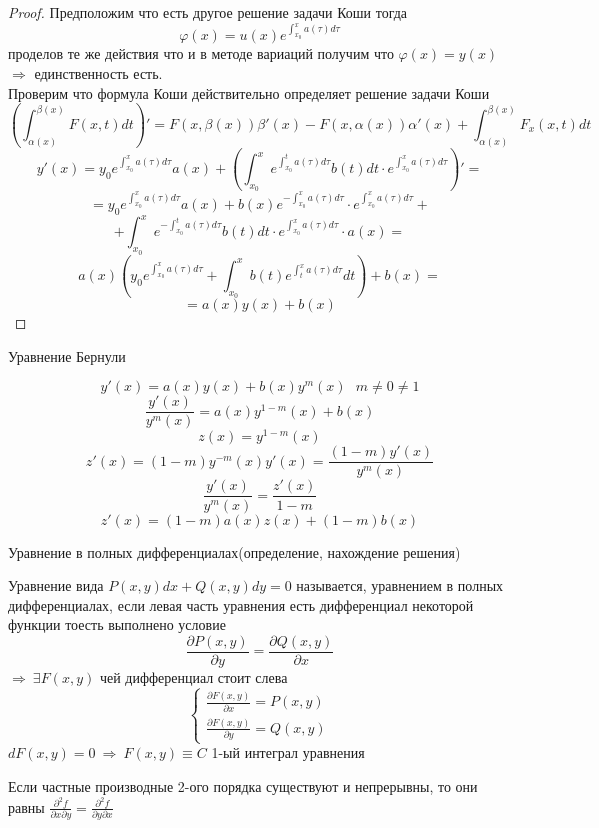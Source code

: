 \begin{proof}
  Предположим что есть другое решение задачи Коши тогда
  $$
  \varphi(x) = u(x) e^{\int_{x_0}^x a(\tau)d\tau}
  $$
  проделов те же действия что и в методе вариаций получим что
  $\varphi(x) = y(x)$ $\Rightarrow$ единственность есть. \\

  Проверим что формула Коши действительно определяет решение задачи Коши
  $$
  \left( \int_{\alpha(x)}^{\beta(x)} F(x, t) dt \right)' =
  F(x, \beta(x)) \beta'(x) - F(x, \alpha(x)) \alpha'(x) +
  \int_{\alpha(x)}^{\beta(x)} F_x(x, t)dt
  $$
  $$
  y'(x) = y_0 e^{\int_{x_0}^x a(\tau) d\tau} a(x) + \left( \int_{x_0}^x
  e^{\int_{x_0}^t a(\tau) d\tau} b(t)dt \cdot
  e^{\int_{x_0}^x a(\tau)d\tau} \right)' =
  $$
  $$
  = y_0 e^{\int_{x_0}^x a(\tau)d\tau} a(x) + b(x)
  e^{-\int_{x_0}^x a(\tau) d\tau} \cdot e^{\int_{x_0}^x a(\tau) d\tau} +
  $$
  $$
  + \int_{x_0}^x e^{-\int_{x_0}^t a(\tau) d\tau} b(t) dt \cdot
  e^{\int_{x_0}^x a(\tau) d\tau} \cdot a(x)=
  $$
  $$
  a(x) \left( y_0 e^{\int_{x_0}^x a(\tau) d\tau} + \int_{x_0}^x b(t)
  e^{\int_t^x a(\tau) d\tau} dt \right) + b(x) =
  $$
  $$
  = a(x)y(x) + b(x)
  $$
\end{proof}

\begin{title}[\Large]
  Уравнение Бернули
\end{title}

\begin{block}
  $$
  y'(x) = a(x)y(x) + b(x)y^m(x) ~~~ m \not= 0 \not= 1
  $$
  $$
  \frac{y'(x)}{y^m(x)} = a(x) y^{1 - m}(x) + b(x)
  $$
  $$
  z(x) = y^{1 - m}(x)
  $$
  $$
  z'(x) = (1 - m) y^{-m}(x) y'(x) = \frac{(1-m)y'(x)}{y^m(x)}
  $$
  $$
  \frac{y'(x)}{y^m(x)} = \frac{z'(x)}{1 - m}
  $$
  $$
  z'(x) = (1 - m) a(x)z(x) + (1 - m)b(x)
  $$
\end{block}

\begin{title}[\Large]
  Уравнение в полных дифференциалах(определение, нахождение решения)
\end{title}

\begin{define}
  Уравнение вида $P(x, y)dx + Q(x, y)dy = 0$ называется, уравнением в полных
  дифференциалах, если левая часть уравнения есть дифференциал некоторой
  функции тоесть выполнено условие
  $$
  \frac{\partial P(x, y)}{\partial y} = \frac{\partial Q(x, y)}{\partial x}
  $$
  $\Rightarrow ~ \exists F(x, y)$ чей дифференциал стоит слева
  $$
  \left\{
  \begin{array}{l}
    \frac{\partial F(x, y)}{\partial x} = P(x, y) \\
    \frac{\partial F(x, y)}{\partial y} = Q(x, y)
  \end{array}
  \right.
  $$
  $dF(x, y) = 0 ~ \Rightarrow ~ F(x, y) \equiv C$ 1-ый интеграл уравнения

  Если частные производные 2-ого порядка существуют и непрерывны, то они равны
  $\frac{\partial^2 f}{\partial x \partial y} =
  \frac{\partial^2 f}{\partial y \partial x}$
\end{define}

